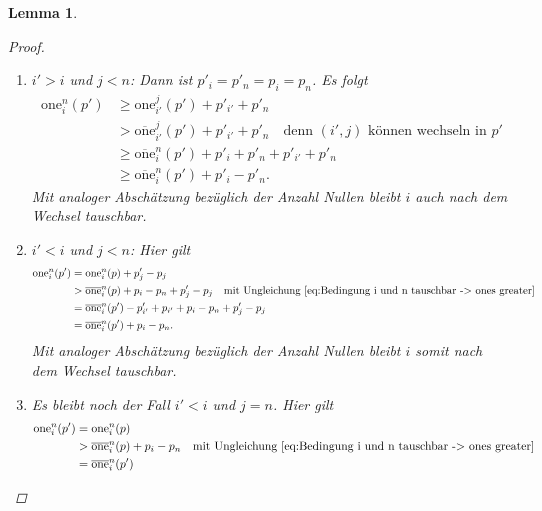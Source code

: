 \documentclass[12pt]{article}
\newtheorem{lem}[thm]{Lemma}
\begin{document}
\begin{lem}
\begin{proof}
\begin{enumerate}
\item
$i'>i$ und $j<n$: Dann ist $p'_i = p'_n = p_i=p_n$. Es folgt
\begin{align*}
\mathrm{one}_{i}^{n}(p')
&\geq
\mathrm{one}_{i'}^{j}(p')
+
p'_{i'}
+
p'_n
\\
&>
\overline{\mathrm{one}}_{i'}^{j}(p')
+
p'_{i'}
+
p'_n
\quad\textrm{denn $(i', j)$ können wechseln in $p'$}
\\
&\geq
\overline{\mathrm{one}}_{i}^{n}(p')
+
p'_i
+
p'_n
+
p'_{i'}
+
p'_n
\\
&\geq
\overline{\mathrm{one}}_i^{n}(p')
+
p'_i-p'_n.
\end{align*}
Mit analoger Abschätzung bezüglich der Anzahl Nullen bleibt $i$ auch nach dem Wechsel tauschbar. 

\item
$i'<i$ und $j<n$:
Hier gilt
\begin{align*}
\mathrm{one}_i^n(p')
&=
\mathrm{one}_i^n(p)
+ p'_j - p_j
\\
&> 
\overline{\mathrm{one}}_i^{n}(p)
 + p_i-p_n
 + p'_j - p_j
\quad \textrm{mit Ungleichung \ref{eq:Bedingung i und n tauschbar -> ones greater}}
\\
&=
\overline{\mathrm{one}}_i^n(p')
- p'_{i'} + p_{i'}
 + p_i-p_n
 + p'_j - p_j
\\
&=
\overline{\mathrm{one}}_i^n(p')
 + p_i-p_n.
\end{align*}
Mit analoger Abschätzung bezüglich der Anzahl Nullen bleibt $i$ somit nach dem Wechsel tauschbar.
\item Es bleibt noch der Fall $i'<i$ und $j=n$. 
Hier gilt
\begin{align*}
\mathrm{one}_i^n(p')
&=
\mathrm{one}_i^n(p)
\\
&> 
\overline{\mathrm{one}}_i^{n}(p)
 + p_i-p_n
\quad \textrm{mit Ungleichung \ref{eq:Bedingung i und n tauschbar -> ones greater}}
\\
&=
\overline{\mathrm{one}}_i^n(p')

\end{align*}
\end{enumerate}
\end{proof}
\end{lem}
\end{document}
